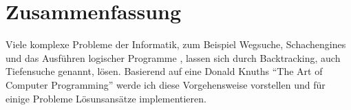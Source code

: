 \chapter*{Zusammenfassung}

Viele komplexe Probleme der Informatik, zum Beispiel Wegsuche, Schachengines und 
das Ausführen logischer Programme \cite[p. ~19]{DBLP:journals/jlp/SomogyiHC96}, lassen sich durch Backtracking, auch Tiefensuche genannt, lösen.
Basierend auf eine Donald Knuths "`The Art of Computer Programming"'\cite{TAOCP} werde ich diese Vorgehensweise vorstellen und für einige Probleme Lösunsansätze implementieren.
